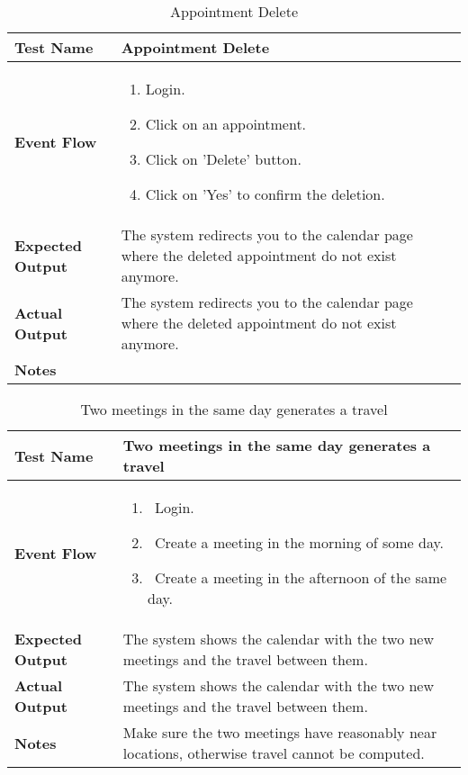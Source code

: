 \begin{table}[h]	
	\centering
	\def\arraystretch{1.5}
	\begin{tabular}{|m{7cm}|m{7cm}|}
		\hline
		\textbf{Test Name}            & Appointment Delete   \\ \hline
		\textbf{Event Flow}             & 
		\begin{enumerate}
			\item Login.
			\item Click on an appointment.
			\item Click on 'Delete' button.
			\item Click on 'Yes' to confirm the deletion.
		\end{enumerate} \\ \hline
		\textbf{Expected Output}  &  The system redirects you to the calendar page where the deleted appointment do not exist anymore.  \\ \hline
		\textbf{Actual Output}       & The system redirects you to the calendar page where the deleted appointment do not exist anymore.    \\ \hline
		\textbf{Notes} & \\ \hline
	\end{tabular}
	\caption{Appointment Delete}
\end{table}


\begin{table}[h]	
\centering
\def\arraystretch{1.5}
\begin{tabular}{|m{7cm}|m{7cm}|}
	\hline
	\textbf{Test Name}            &  Two meetings in the same day generates a travel  \\ \hline
	\textbf{Event Flow}             & 
		\begin{enumerate}
			\item~Login.
			\item~Create a meeting in the morning of some day.
			\item~Create a meeting in the afternoon of the same day.
		\end{enumerate}
	  \\ \hline
	\textbf{Expected Output}  &   The system shows the calendar with the two new meetings and the travel between them.  \\ \hline
	\textbf{Actual Output}       &  The system shows the calendar with the two new meetings and the travel between them.   \\ \hline
	\textbf{Notes} &  Make sure the two meetings have reasonably near locations, otherwise travel cannot be computed.  \\ \hline
\end{tabular}
\caption{Two meetings in the same day generates a travel}
\end{table}


